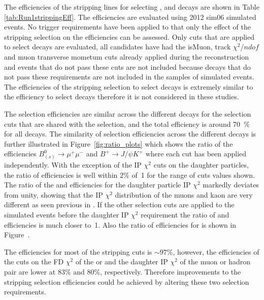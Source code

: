 The efficiencies of the stripping lines for selecting \bsmumu, \bhh and \bujpsik decays are shown in Table \ref{tab:Run1strippingEff}. The efficiencies are evaluated using 2012 sim06 simulated events. No trigger requirements have been applied to that only the effect of the stripping selection on the efficiencies can be assessed. %
Only cuts that are applied to select \bmumu decays are evaluated, all candidates have had the isMuon, track $\chi^{2}$/$ndof$ and muon transverse mometum cuts already applied during the reconstruction and events that do not pass these cuts are not included because decays that do not pass these requirements are not included in the samples of simulated events. The efficiencies of the stripping selection to select \bdmumu decays is extremely similar to the efficiency to select \bsmumu decays therefore it is not considered in these studies.

The selection efficiencies are similar across the different decays for the selection cuts that are shared with the \bmumu selection, and the total efficiency is around 70~$\%$ for all decays. The similarity of selection efficiencies across the different decays is further illustrated in Figure~\ref{fig:ratio_plots} which shows the ratio of the efficiencies $B^{0}_{(s)}\to\mu^{+} \mu^{-}$ and $B^{+}\to J/\psi K^{+}$ where each cut has been applied independently.  With the exception of the IP $\chi^{2}$ cuts on the daughter particles, the ratio of efficiencies is well within $2\%$ of~1 for the range of cuts values shown. The ratio of the \bsmumu and \bujpsik efficiencies for the daughter particle IP $\chi^{2}$ markedly deviates from unity, showing that the IP $\chi^{2}$ distribution of the muons and kaon are very different as seen previous in \cite{Diego}. If the other selection cuts are applied to the simulated events before the daughter IP $\chi^{2}$ requirement the ratio of \bmumu and \bujpsik efficiencies is much closer to~1. Also the ratio of efficiencies for \bdkpi is shown in Figure~.


The efficiencies for most of the stripping cuts is $\sim 97 \%$, however, the efficiencies of the cuts on the FD $\chi^{2}$ of the \bsd or \jpsi and the daughter IP $\chi^{2}$ of the muon or hadron pair are lower at $83 \%$ and $80 \%$, respectively. Therefore improvements to the stripping selection efficiencies could be achieved by altering these two selection requirements. 


